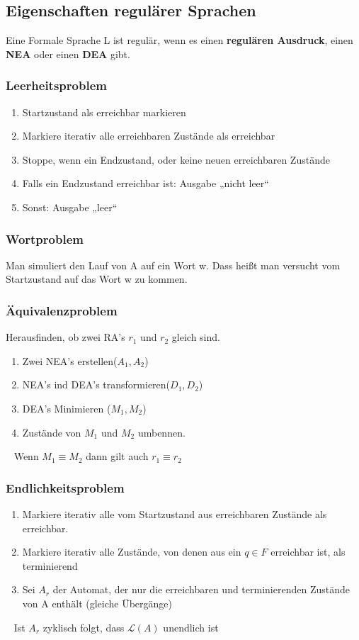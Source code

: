 \documentclass[12pt,a4paper]{article}
\begin{document}
	\subsection{Eigenschaften regulärer Sprachen}
	Eine Formale Sprache L ist regulär, wenn es einen \textbf{regulären Ausdruck}, einen \textbf{NEA} oder einen \textbf{DEA} gibt.

	\subsubsection{Leerheitsproblem}
	\begin{enumerate}
	\item Startzustand als erreichbar markieren
	\item Markiere iterativ alle erreichbaren Zustände als erreichbar
	\item Stoppe, wenn ein Endzustand, oder keine neuen erreichbaren Zustände
	\item Falls ein Endzustand erreichbar ist: Ausgabe „nicht leer“
	\item Sonst: Ausgabe „leer“
	\end{enumerate}

	\subsubsection{Wortproblem}
	Man simuliert den Lauf von A auf ein Wort w. Dass heißt man versucht vom Startzustand auf das Wort w zu kommen.

	\subsubsection{Äquivalenzproblem}
	Herausfinden, ob zwei RA's $r_1$ und $r_2$ gleich sind.

	\begin{enumerate}
	\item Zwei NEA's erstellen($A_1, A_2$)
	\item NEA's ind DEA's transformieren($D_1, D_2$)
	\item DEA's Minimieren ($M_1, M_2$)
	\item Zustände von $M_1$ und $M_2$ umbennen.
	\end{enumerate}
	~\newline
	Wenn $M_1 \equiv M_2$ dann gilt auch $r_1 \equiv r_2$

	\subsubsection{Endlichkeitsproblem}
	\begin{enumerate}
		\item Markiere iterativ alle vom Startzustand aus erreichbaren Zustände als erreichbar.
		\item Markiere iterativ alle Zustände, von denen aus ein $q \in F$ erreichbar ist, als terminierend
		\item Sei $A_r$ der Automat, der nur die erreichbaren und terminierenden Zustände von A enthält (gleiche Übergänge)
	\end{enumerate}
	~\newline
	Ist $A_r$ zyklisch folgt, dass $\mathcal{L}(A)$ unendlich ist 
\end{document}
